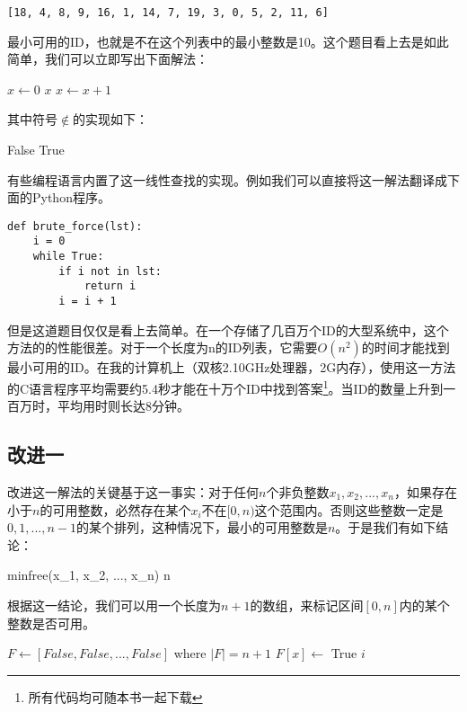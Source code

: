 \documentclass[UTF8]{article}
\begin{document}
\begin{verbatim}
[18, 4, 8, 9, 16, 1, 14, 7, 19, 3, 0, 5, 2, 11, 6]
\end{verbatim}

最小可用的ID，也就是不在这个列表中的最小整数是10。这个题目看上去是如此简单，我们可以立即写出下面解法：

\begin{algorithmic}[1]
  \State $x \gets 0$
  \Loop
      \State \Return $x$
    \Else
      \State $x \gets x + 1$
    \EndIf
  \EndLoop
\EndFunction
\end{algorithmic}

其中符号$\notin$的实现如下：

\begin{algorithmic}[1]
      \State \Return False
    \EndIf
  \EndFor
  \State \Return True
\EndFunction
\end{algorithmic}

有些编程语言内置了这一线性查找的实现。例如我们可以直接将这一解法翻译成下面的Python程序。

\lstset{language=Python}
\begin{lstlisting}
def brute_force(lst):
    i = 0
    while True:
        if i not in lst:
            return i
        i = i + 1
\end{lstlisting}

但是这道题目仅仅是看上去简单。在一个存储了几百万个ID的大型系统中，这个方法的的性能很差。对于一个长度为n的ID列表，它需要$O(n^2)$的时间才能找到最小可用的ID。在我的计算机上（双核2.10GHz处理器，2G内存），使用这一方法的C语言程序平均需要约5.4秒才能在十万个ID中找到答案\footnote{所有代码均可随本书一起下载}。当ID的数量上升到一百万时，平均用时则长达8分钟。

\subsection{改进一}
改进这一解法的关键基于这一事实：对于任何$n$个非负整数$x_1, x_2, ..., x_n$，如果存在小于$n$的可用整数，必然存在某个$x_i$不在$[0, n)$这个范围内。否则这些整数一定是$0, 1, ..., n-1$的某个排列，这种情况下，最小的可用整数是$n$。于是我们有如下结论：

\be
minfree(x_1, x_2, ..., x_n) \leq n
\label{min-free}
\ee

根据这一结论，我们可以用一个长度为$n+1$的数组，来标记区间$[0, n]$内的某个整数是否可用。

\begin{algorithmic}[1]
  \State $F \gets [False, False, ..., False]$ where $|F| = n+1$
      \State $F[x] \gets$ True
    \EndIf
  \EndFor
      \State \Return $i$
    \EndIf
  \EndFor
\EndFunction
\end{algorithmic}
\end{document}
